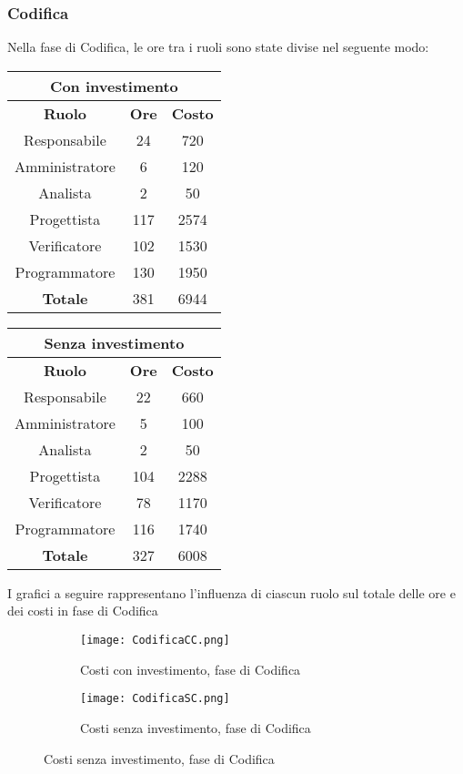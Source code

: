 \documentclass{scalatekids-article}
\begin{document}
\subsubsection{Codifica}
Nella fase di Codifica, le ore tra i ruoli sono state divise nel seguente modo:
\begin{center}
  \normalsize
  \begin{tabular}{| c | c | c |}
    \hline
    \multicolumn{3}{|c|}{\textbf{Con investimento}}\\
    \hline
    \textbf{Ruolo} & \textbf{Ore} & \textbf{Costo}\\
    \hline
    Responsabile & 24 & 720\\
    Amministratore & 6 & 120\\
    Analista & 2 & 50\\
    Progettista & 117 & 2574\\
    Verificatore & 102 & 1530 \\
    Programmatore & 130 & 1950 \\
    \hline
    \textbf{Totale} & 381 & 6944\\
    \hline
  \end{tabular}
  \qquad
  \begin{tabular}{| c | c | c |}
    \hline
    \multicolumn{3}{|c|}{\textbf{Senza investimento}}\\
    \hline
    \textbf{Ruolo} & \textbf{Ore} & \textbf{Costo}\\
    \hline
    Responsabile & 22 & 660\\
    Amministratore & 5 & 100\\
    Analista & 2 & 50\\
    Progettista & 104 & 2288\\
    Verificatore & 78 & 1170 \\
    Programmatore & 116 & 1740 \\
    \hline
    \textbf{Totale} & 327 & 6008 \\
    \hline
  \end{tabular}
\end{center}
I grafici a seguire rappresentano l'influenza di ciascun ruolo sul totale delle ore e dei costi in fase di Codifica 
\begin{figure}[H]
  \begin{subfigure}[H]{0.47\textwidth}
    \texttt{[image: CodificaCC.png]}
    \caption{Costi con investimento, fase di Codifica}
  \end{subfigure}
  \qquad
  \begin{subfigure}[H]{0.47\textwidth}
    \texttt{[image: CodificaSC.png]}
    \caption{Costi senza investimento, fase di Codifica}
  \end{subfigure}
\end{figure}
\newpage
\end{document}
